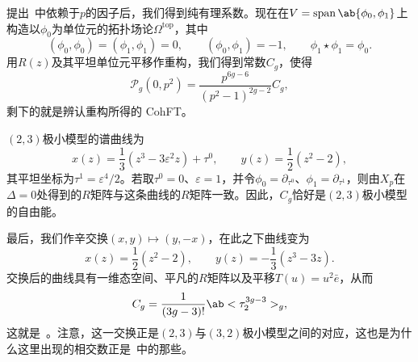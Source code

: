 \documentclass{amsart}
\theoremstyle{definition}
\theoremstyle{remark}
\theoremstyle{plain}
\theoremstyle{definition}
\theoremstyle{remark}
\newcommand{\ep}{\varepsilon}
\newcommand{\mc}[1]{\mathcal{#1}}
\newcommand{\mr}[1]{\mathrm{#1}}
\newcommand{\on}[1]{\operatorname{#1}}
\newcommand{\1}{\mathbf{1}}
\newcommand{\2}{\mathbf{2}}
\newcommand{\3}{\mathbf{3}}
\begin{document}
提出~中依赖于\(p\)的因子后，我们得到纯有理系数。现在在\(V = \on{span}\ab\{\phi_0,\phi_1\}\)上构造以\(\phi_0\)为单位元的拓扑场论\(\Omega^{\mr{top}}\)，其中
\[ (\phi_0,\phi_0) = (\phi_1,\phi_1) = 0, \qquad (\phi_0,\phi_1) = -1, \qquad \phi_1 \star \phi_1 = \phi_0. \]
用\(R(z)\)及其平坦单位元平移作重构，我们得到常数\(C_g\)，使得
\[ \mc{P}_g(0,p^2) = \frac{p^{6g-6}}{(p^2-1)^{2g-2}}C_g, \]
剩下的就是辨认重构所得的 CohFT。

\((2,3)\)极小模型的谱曲线为
\[ x(z) = \frac{1}{3}(z^3-3\ep^2 z) + \tau^0, \qquad y(z) = \frac{1}{2}(z^2-2), \]
其平坦坐标为\(\tau^1 = \ep^4/2\)。若取\(\tau^0 = 0\)、\(\ep = 1\)，并令\(\phi_0 = \partial_{\tau^0}\)、\(\phi_1 = \partial_{\tau^1}\)，则由\(X_p\)在\(\Delta = 0\)处得到的\(R\)矩阵与这条曲线的\(R\)矩阵一致。因此，\(C_g\)恰好是\((2,3)\)极小模型的自由能。

最后，我们作辛交换\((x,y) \mapsto (y,-x)\)，在此之下曲线变为
\[ x(z) = \frac{1}{2}(z^2-2), \qquad y(z) = -\frac{1}{3}(z^3-3z). \]
交换后的曲线具有一维态空间、平凡的\(R\)矩阵以及平移\(T(u) = u^2 \bar{e}\)，从而
\[ C_g = \frac{1}{(3g-3)!}\ab<\tau_2^{3g-3}>_g, \]
这就是~。注意，这一交换正是\((2,3)\)与\((3,2)\)极小模型之间的对应，这也是为什么这里出现的相交数正是~中的那些。


\printbibliography
\end{document}
